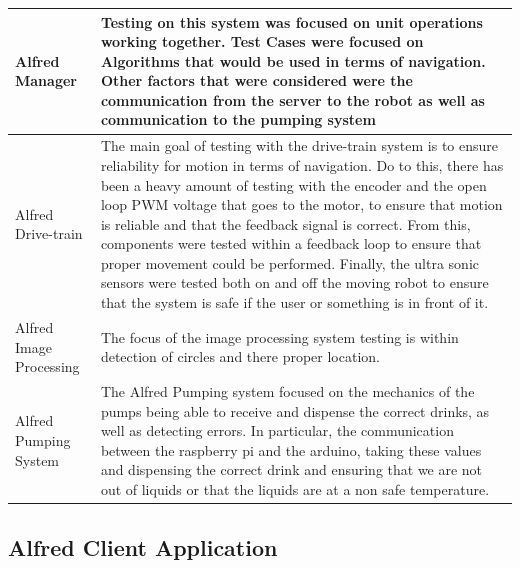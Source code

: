 \documentclass [10pt]{article}
\begin{document}
\begin{longtable}{| p{} | p{} |}
		Alfred Manager & Testing on this system was focused on unit operations working together. Test Cases were focused on Algorithms that would be used in terms of navigation. Other factors that were considered were the communication from the server to the robot as well as communication to the pumping system \\ \hline
	 	Alfred Drive-train & The main goal of testing with the drive-train system is to ensure reliability for motion in terms of navigation. Do to this, there has been a heavy amount of testing with the encoder and the open loop PWM voltage that goes to the motor, to ensure that motion is reliable and that the feedback signal is correct. From this, components were tested within a feedback loop to ensure that proper movement could be performed. Finally, the ultra sonic sensors were tested both on and off the moving robot to ensure that the system is safe if the user or something is in front of it.\\ \hline	
	 	Alfred Image Processing & The focus of the image processing system testing is within detection of circles and there proper location.  \\ \hline	
	 	Alfred Pumping System & The Alfred Pumping system focused on the mechanics of the pumps being able to receive and dispense the correct drinks, as well as detecting errors. In particular, the communication between the raspberry pi and the arduino, taking these values and dispensing the correct drink and ensuring that we are not out of liquids or that the liquids are at a non safe temperature. \\ \hline	
	\end{longtable}
\subsection{Alfred Client Application}
\end{document}
